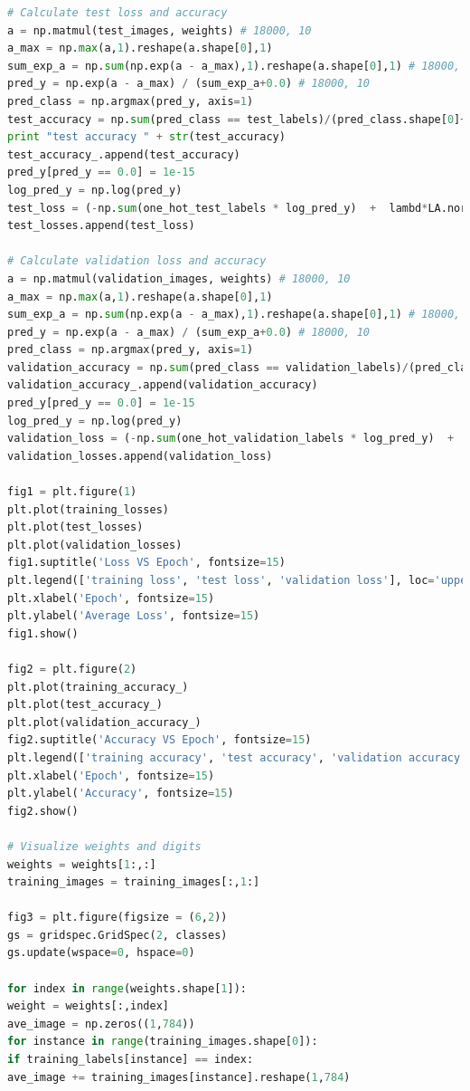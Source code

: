 \documentclass{article} %
\begin{document}
{\begin{lstlisting}[language=Python]
# Calculate test loss and accuracy
a = np.matmul(test_images, weights) # 18000, 10
a_max = np.max(a,1).reshape(a.shape[0],1)
sum_exp_a = np.sum(np.exp(a - a_max),1).reshape(a.shape[0],1) # 18000, 1
pred_y = np.exp(a - a_max) / (sum_exp_a+0.0) # 18000, 10
pred_class = np.argmax(pred_y, axis=1)
test_accuracy = np.sum(pred_class == test_labels)/(pred_class.shape[0]+0.0)
print "test accuracy " + str(test_accuracy)
test_accuracy_.append(test_accuracy)
pred_y[pred_y == 0.0] = 1e-15
log_pred_y = np.log(pred_y)
test_loss = (-np.sum(one_hot_test_labels * log_pred_y)  +  lambd*LA.norm(weights)**2) / test_images.shape[0]
test_losses.append(test_loss)

# Calculate validation loss and accuracy
a = np.matmul(validation_images, weights) # 18000, 10
a_max = np.max(a,1).reshape(a.shape[0],1)
sum_exp_a = np.sum(np.exp(a - a_max),1).reshape(a.shape[0],1) # 18000, 1
pred_y = np.exp(a - a_max) / (sum_exp_a+0.0) # 18000, 10
pred_class = np.argmax(pred_y, axis=1)
validation_accuracy = np.sum(pred_class == validation_labels)/(pred_class.shape[0]+0.0) 
validation_accuracy_.append(validation_accuracy)
pred_y[pred_y == 0.0] = 1e-15
log_pred_y = np.log(pred_y)
validation_loss = (-np.sum(one_hot_validation_labels * log_pred_y)  +  lambd*LA.norm(weights)**2) / validation_images.shape[0]
validation_losses.append(validation_loss) 

fig1 = plt.figure(1)
plt.plot(training_losses)
plt.plot(test_losses)
plt.plot(validation_losses)
fig1.suptitle('Loss VS Epoch', fontsize=15)
plt.legend(['training loss', 'test loss', 'validation loss'], loc='upper right')
plt.xlabel('Epoch', fontsize=15)
plt.ylabel('Average Loss', fontsize=15)
fig1.show()

fig2 = plt.figure(2)
plt.plot(training_accuracy_)
plt.plot(test_accuracy_)
plt.plot(validation_accuracy_)
fig2.suptitle('Accuracy VS Epoch', fontsize=15)
plt.legend(['training accuracy', 'test accuracy', 'validation accuracy'], loc='lower right')
plt.xlabel('Epoch', fontsize=15)
plt.ylabel('Accuracy', fontsize=15)
fig2.show()

# Visualize weights and digits
weights = weights[1:,:]
training_images = training_images[:,1:]

fig3 = plt.figure(figsize = (6,2))
gs = gridspec.GridSpec(2, classes)
gs.update(wspace=0, hspace=0)

for index in range(weights.shape[1]):
weight = weights[:,index]
ave_image = np.zeros((1,784))
for instance in range(training_images.shape[0]):
if training_labels[instance] == index:
ave_image += training_images[instance].reshape(1,784)


\end{lstlisting}}
\end{document}
